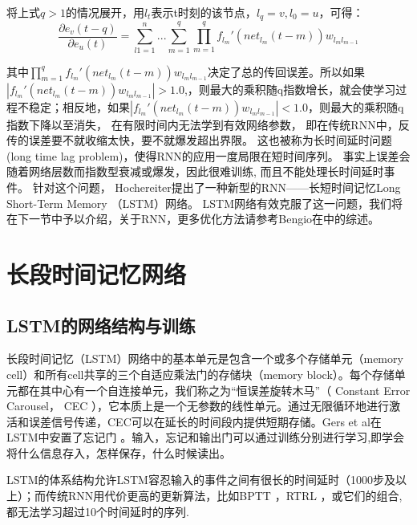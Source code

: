 将上式$q>1$的情况展开，用$l_t$表示t时刻的该节点，$l_q = v, l_0 = u$，可得：
\begin{equation}
 \frac{\partial e_v(t-q)}{\partial e_u(t)} = \sum_{l1=1}^n ... \sum_{m=1}^q{\prod_{m=1}^q{f_{l_m}'(net_{l_m}(t-m))w_{l_ml_{m-1}}}}
\end{equation}

其中$\prod_{m=1}^q{f_{l_m}'(net_{l_m}(t-m))w_{l_ml_{m-1}}}$决定了总的传回误差。所以如果$|{f_{l_m}'(net_{l_m}(t-m))w_{l_ml_{m-1}}}|>1.0$,，则最大的乘积随q指数增长，就会使学习过程不稳定；相反地，如果$|{f_{l_m}'(net_{l_m}(t-m))w_{l_ml_{m-1}}}|<1.0$，则最大的乘积随q指数下降以至消失， 在有限时间内无法学到有效网络参数， 即在传统RNN中，反传的误差要不就收缩太快，要不就爆发超出界限。 这也被称为长时间延时问题(long time lag problem)，使得RNN的应用一度局限在短时间序列。 事实上误差会随着网络层数而指数型衰减或爆发，因此很难训练, 而且不能处理长时间延时事件。 针对这个问题， Hochereiter提出了一种新型的RNN——长短时间记忆Long Short-Term Memory \cite{hochreiter1997long} （LSTM）网络。 LSTM网络有效克服了这一问题，我们将在下一节中予以介绍，关于RNN，更多优化方法请参考Bengio在\cite{bengio2013advances}中的综述。








\section{长段时间记忆网络}
\subsection{LSTM的网络结构与训练}
长段时间记忆（LSTM）网络中的基本单元是包含一个或多个存储单元（memory cell）和所有cell共享的三个自适应乘法门的存储块（memory block）。每个存储单元都在其中心有一个自连接单元，我们称之为“恒误差旋转木马”（ Constant Error Carousel， CEC ），它本质上是一个无参数的线性单元。通过无限循环地进行激活和误差信号传递，CEC可以在延长的时间段内提供短期存储。Gers et al在LSTM中安置了忘记门 \cite{gers2000learning}。输入，忘记和输出门可以通过训练分别进行学习,即学会将什么信息存入，怎样保存，什么时候读出。
 

LSTM的体系结构允许LSTM容忍输入的事件之间有很长的时间延时（1000步及以上）；而传统RNN用代价更高的更新算法，比如BPTT \cite{williams1990efficient}，RTRL \cite{robinson1987utility,williams1989learning}，或它们的组合\cite{schmidhuber1992fixed,williams1995gradient},都无法学习超过10个时间延时的序列\cite{hochreiter1991untersuchungen,bengio1994learning,hochreiter1997long, gers2000learning,hochreiter2001gradient}.

